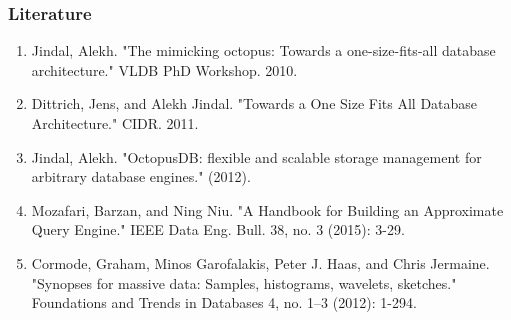 \documentclass{beamer}
\begin{document}
\begin{frame}
\frametitle{Literature}
\begin{enumerate}
\item{Jindal, Alekh. "The mimicking octopus: Towards a one-size-fits-all database architecture." VLDB PhD Workshop. 2010.}
\item{Dittrich, Jens, and Alekh Jindal. "Towards a One Size Fits All Database Architecture." CIDR. 2011.}
\item{Jindal, Alekh. "OctopusDB: flexible and scalable storage management for arbitrary database engines." (2012).}
\item{Mozafari, Barzan, and Ning Niu. "A Handbook for Building an Approximate Query Engine." IEEE Data Eng. Bull. 38, no. 3 (2015): 3-29.}
\item{Cormode, Graham, Minos Garofalakis, Peter J. Haas, and Chris Jermaine. "Synopses for massive data: Samples, histograms, wavelets, sketches." Foundations and Trends in Databases 4, no. 1–3 (2012): 1-294.}
\end{enumerate}
\end{frame}
\end{document}
